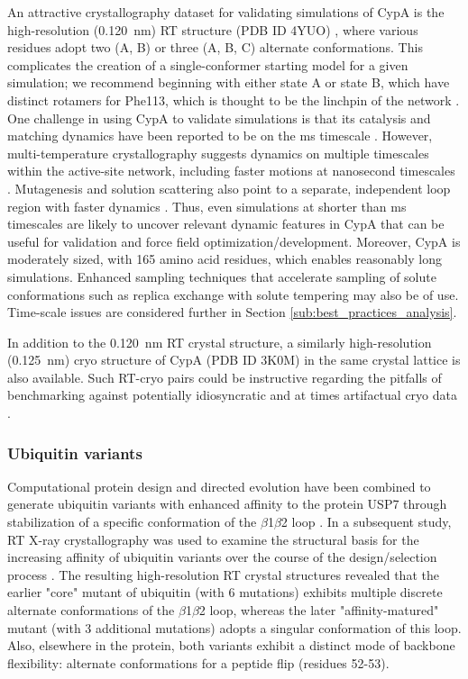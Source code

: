 \documentclass[9pt,review]{livecoms}
\begin{document}
An attractive crystallography dataset for validating simulations of CypA is the high-resolution (\qty{0.120}{\nano\meter}) RT structure (PDB ID 4YUO) \cite{keedy_mapping_2015}, where various residues adopt two (A, B) or three (A, B, C) alternate conformations.
This complicates the creation of a single-conformer starting model for a given simulation; we recommend beginning with either state A or state B, which have distinct rotamers for Phe113, which is thought to be the linchpin of the network \cite{keedy_mapping_2015}.
One challenge in using CypA to validate simulations is that its catalysis and matching dynamics have been reported to be on the ms timescale \cite{eisenmesser_intrinsic_2005}.
However, multi-temperature crystallography suggests dynamics on multiple timescales within the active-site network, including faster motions at nanosecond timescales \cite{keedy_mapping_2015}.
Mutagenesis and solution scattering also point to a separate, independent loop region with faster dynamics \cite{thompson_temperature-jump_2019}.
Thus, even simulations at shorter than ms timescales are likely to uncover relevant dynamic features in CypA that can be useful for validation and force field optimization/development.
Moreover, CypA is moderately sized, with 165 amino acid residues, which enables reasonably long simulations.
Enhanced sampling techniques \cite{henin_enhanced_2022} that accelerate sampling of solute conformations such as replica exchange with solute tempering \cite{wang_replica_2011} may also be of use.
Time-scale issues are considered further in Section \ref{sub:best_practices_analysis}.

In addition to the \qty{0.120}{\nano\meter} RT crystal structure, a similarly high-resolution (\qty{0.125}{\nano\meter}) cryo structure of CypA (PDB ID 3K0M) \cite{fraser_hidden_2009} in the same crystal lattice is also available.
Such RT-cryo pairs could be instructive regarding the pitfalls of benchmarking against potentially idiosyncratic \cite{keedy_crystal_2014} and at times artifactual cryo data \cite{cbradford_temperature_2021}.

\subsubsection{Ubiquitin variants}
\label{sub2:ubiquitin}

Computational protein design and directed evolution have been combined to generate ubiquitin variants with enhanced affinity to the protein USP7 through stabilization of a specific conformation of the $\beta$1$\beta$2 loop \cite{zhang_conformational_2013}.
In a subsequent study, RT X-ray crystallography was used to examine the structural basis for the increasing affinity of ubiquitin variants over the course of the design/selection process \cite{biel_flexibility_2017}.
The resulting high-resolution RT crystal structures revealed that the earlier "core" mutant of ubiquitin (with 6 mutations) exhibits multiple discrete alternate conformations of the $\beta$1$\beta$2 loop, whereas the later "affinity-matured" mutant (with 3 additional mutations) adopts a singular conformation of this loop.
Also, elsewhere in the protein, both variants exhibit a distinct mode of backbone flexibility: alternate conformations for a peptide flip (residues 52-53).
\end{document}

